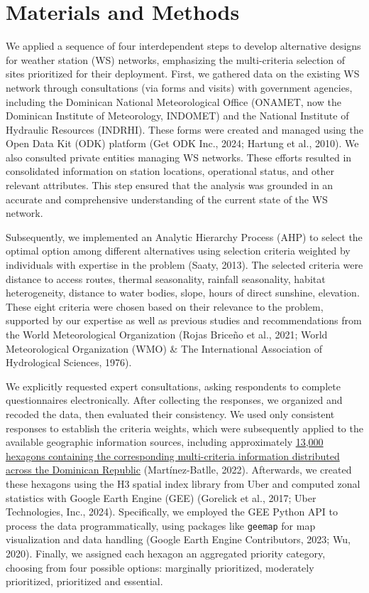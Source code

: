 \documentclass[spanish]{article}
\begin{document}
\hypertarget{materials-and-methods}{%
\section{Materials and Methods}\label{materials-and-methods}}

We applied a sequence of four interdependent steps to develop
alternative designs for weather station (WS) networks, emphasizing the
multi-criteria selection of sites prioritized for their deployment.
First, we gathered data on the existing WS network through consultations
(via forms and visits) with government agencies, including the Dominican
National Meteorological Office (ONAMET, now the Dominican Institute of
Meteorology, INDOMET) and the National Institute of Hydraulic Resources
(INDRHI). These forms were created and managed using the Open Data Kit
(ODK) platform (Get ODK Inc., 2024; Hartung et al., 2010). We also
consulted private entities managing WS networks. These efforts resulted
in consolidated information on station locations, operational status,
and other relevant attributes. This step ensured that the analysis was
grounded in an accurate and comprehensive understanding of the current
state of the WS network.

Subsequently, we implemented an Analytic Hierarchy Process (AHP) to
select the optimal option among different alternatives using selection
criteria weighted by individuals with expertise in the problem (Saaty,
2013). The selected criteria were distance to access routes, thermal
seasonality, rainfall seasonality, habitat heterogeneity, distance to
water bodies, slope, hours of direct sunshine, elevation. These eight
criteria were chosen based on their relevance to the problem, supported
by our expertise as well as previous studies and recommendations from
the World Meteorological Organization (Rojas Briceño et al., 2021; World
Meteorological Organization (WMO) \& The International Association of
Hydrological Sciences, 1976).

We explicitly requested expert consultations, asking respondents to
complete questionnaires electronically. After collecting the responses,
we organized and recoded the data, then evaluated their consistency. We
used only consistent responses to establish the criteria weights, which
were subsequently applied to the available geographic information
sources, including approximately
\href{https://geofis.github.io/zonal-statistics/README.html}{13,000
hexagons containing the corresponding multi-criteria information
distributed across the Dominican Republic} (Martínez-Batlle, 2022).
Afterwards, we created these hexagons using the H3 spatial index library
from Uber and computed zonal statistics with Google Earth Engine (GEE)
(Gorelick et al., 2017; Uber Technologies, Inc., 2024). Specifically, we
employed the GEE Python API to process the data programmatically, using
packages like \texttt{geemap} for map visualization and data handling
(Google Earth Engine Contributors, 2023; Wu, 2020). Finally, we assigned
each hexagon an aggregated priority category, choosing from four
possible options: marginally prioritized, moderately prioritized,
prioritized and essential.
\end{document}
